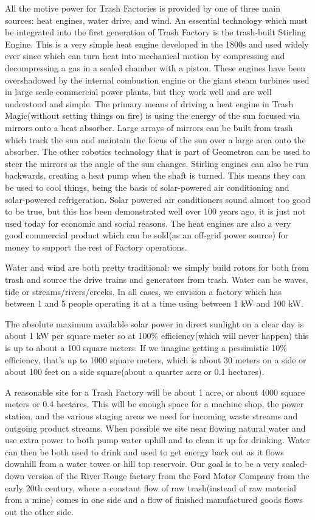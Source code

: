 All the motive power for Trash Factories is provided by one of three
main sources: heat engines, water drive, and wind. An essential
technology which must be integrated into the first generation of Trash
Factory is the trash-built Stirling Engine. This is a very simple heat
engine developed in the 1800s and used widely ever since which can turn
heat into mechanical motion by compressing and decompressing a gas in a
sealed chamber with a piston. These engines have been overshadowed by
the internal combustion engine or the giant steam turbines used in large
scale commercial power plants, but they work well and are well
understood and simple. The primary means of driving a heat engine in
Trash Magic(without setting things on fire) is using the energy of the
sun focused via mirrors onto a heat absorber. Large arrays of mirrors
can be built from trash which track the sun and maintain the focus of
the sun over a large area onto the absorber. The other robotics
technology that is part of Geometron can be used to steer the mirrors as
the angle of the sun changes. Stirling engines can also be run
backwards, creating a heat pump when the shaft is turned. This means
they can be used to cool things, being the basis of solar-powered air
conditioning and solar-powered refrigeration. Solar powered air
conditioners sound almost too good to be true, but this has been
demonstrated well over 100 years ago, it is just not used today for
economic and social reasons. The heat engines are also a very good
commercial product which can be sold(as an off-grid power source) for
money to support the rest of Factory operations.

Water and wind are both pretty traditional: we simply build rotors for
both from trash and source the drive trains and generators from trash.
Water can be waves, tide or streams/rivers/creeks. In all cases, we
envision a factory which has between 1 and 5 people operating it at a
time using between 1 kW and 100 kW.

The absolute maximum available solar power in direct sunlight on a clear
day is about 1 kW per square meter so at 100\% efficiency(which will
never happen) this is up to about a 100 square meters. If we imagine
getting a pessimistic 10\% efficiency, that's up to 1000 square meters,
which is about 30 meters on a side or about 100 feet on a side
square(about a quarter acre or 0.1 hectares).

A reasonable site for a Trash Factory will be about 1 acre, or about
4000 square meters or 0.4 hectares. This will be enough space for a
machine shop, the power station, and the various staging areas we need
for incoming waste streams and outgoing product streams. When possible
we site near flowing natural water and use extra power to both pump
water uphill and to clean it up for drinking. Water can then be both
used to drink and used to get energy back out as it flows downhill from
a water tower or hill top reservoir. Our goal is to be a very
scaled-down version of the River Rouge factory from the Ford Motor
Company from the early 20th century, where a constant flow of raw
trash(instead of raw material from a mine) comes in one side and a flow
of finished manufactured goods flows out the other side.

